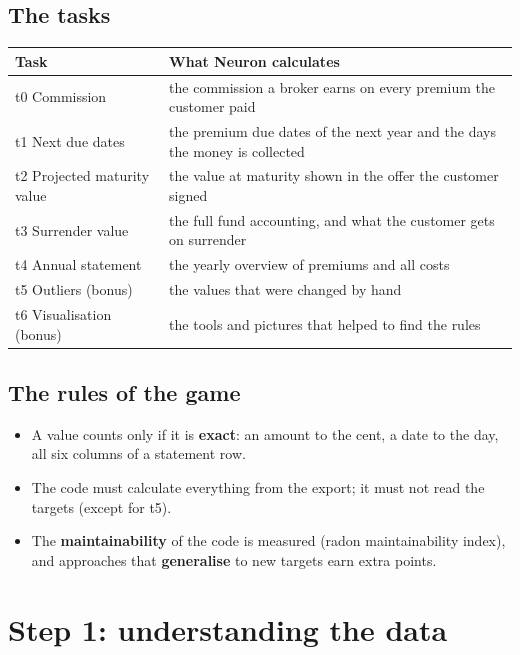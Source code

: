 \documentclass[11pt,a4paper]{article}
\begin{document}
\subsection{The tasks}
\begin{center}
\begin{tabularx}{\textwidth}{@{}lL@{}}
\toprule
Task & What Neuron calculates \\
\midrule
t0 Commission & the commission a broker earns on every premium the customer paid \\
t1 Next due dates & the premium due dates of the next year and the days the money is collected \\
t2 Projected maturity value & the value at maturity shown in the offer the customer signed \\
t3 Surrender value & the full fund accounting, and what the customer gets on surrender \\
t4 Annual statement & the yearly overview of premiums and all costs \\
t5 Outliers (bonus) & the values that were changed by hand \\
t6 Visualisation (bonus) & the tools and pictures that helped to find the rules \\
\bottomrule
\end{tabularx}
\end{center}

\subsection{The rules of the game}
\begin{itemize}
  \item A value counts only if it is \textbf{exact}: an amount to the cent, a date to the day, all six columns of a
        statement row.
  \item The code must calculate everything from the export; it must not read the targets (except for t5).
  \item The \textbf{maintainability} of the code is measured (radon maintainability index), and approaches that
        \textbf{generalise} to new targets earn extra points.
\end{itemize}

\section{Step 1: understanding the data}
\end{document}
